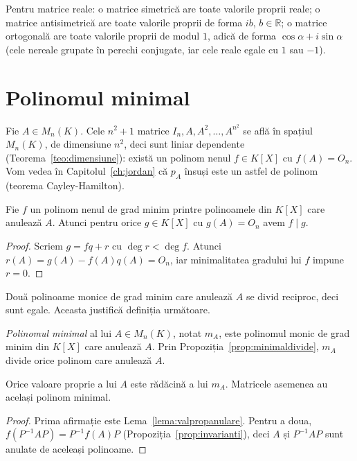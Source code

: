 \begin{observatie}
Pentru matrice reale: o matrice simetrică are toate valorile proprii reale; o matrice antisimetrică are toate valorile proprii de forma $ib$, $b\in\mathbb{R}$; o matrice ortogonală are toate valorile proprii de modul $1$, adică de forma $\cos\alpha+i\sin\alpha$ (cele nereale grupate în perechi conjugate, iar cele reale egale cu $1$ sau $-1$).
\end{observatie}

\section{Polinomul minimal}

Fie $A\in M_n(K)$. Cele $n^2+1$ matrice $I_n,A,A^2,\dots,A^{n^2}$ se află în spațiul $M_n(K)$, de dimensiune $n^2$, deci sunt liniar dependente (Teorema~\ref{teo:dimensiune}): există un polinom nenul $f\in K[X]$ cu $f(A)=O_n$. Vom vedea în Capitolul~\ref{ch:jordan} că $p_A$ însuși este un astfel de polinom (teorema Cayley-Hamilton).

\begin{propozitie}\label{prop:minimaldivide}
Fie $f$ un polinom nenul de grad minim printre polinoamele din $K[X]$ care anulează $A$. Atunci pentru orice $g\in K[X]$ cu $g(A)=O_n$ avem $f\mid g$.
\end{propozitie}

\begin{proof}
Scriem $g=fq+r$ cu $\deg r<\deg f$. Atunci $r(A)=g(A)-f(A)q(A)=O_n$, iar minimalitatea gradului lui $f$ impune $r=0$.
\end{proof}

Două polinoame monice de grad minim care anulează $A$ se divid reciproc, deci sunt egale. Aceasta justifică definiția următoare.

\begin{definitie}
\emph{Polinomul minimal} al lui $A\in M_n(K)$, notat $m_A$, este polinomul monic de grad minim din $K[X]$ care anulează $A$. Prin Propoziția~\ref{prop:minimaldivide}, $m_A$ divide orice polinom care anulează $A$.
\end{definitie}

\begin{propozitie}\label{prop:minimalvalprop}
Orice valoare proprie a lui $A$ este rădăcină a lui $m_A$. Matricele asemenea au același polinom minimal.
\end{propozitie}

\begin{proof}
Prima afirmație este Lema~\ref{lema:valpropanulare}. Pentru a doua, $f(P^{-1}AP)=P^{-1}f(A)P$ (Propoziția~\ref{prop:invarianti}), deci $A$ și $P^{-1}AP$ sunt anulate de aceleași polinoame.
\end{proof}

